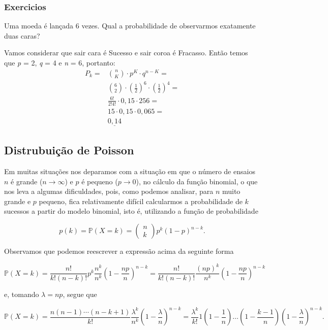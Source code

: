 \documentclass[10pt,a4paper]{article}
\begin{document}
\subsubsection{Exercicios}
\begin{ex}
	Uma moeda é lançada 6 vezes. Qual a probabilidade de observarmos exatamente duas caras?
\end{ex}
\begin{sol}
	Vamos considerar que sair cara é Sucesso e sair coroa é Fracasso. Então temos que \textit{p} = 2, \textit{q} = 4 e \textit{n} = 6, portanto:
	\[
		\begin{aligned}
		P_{k} =& \binom{n}{K} \cdot p^{K} \cdot q^{n-K} =		\\
		& \binom{6}{2} \cdot (\frac{1}{2})^{6} \cdot (\frac{1}{2})^{4} =\\
		& \frac{6!}{2!4!} \cdot 0,15 \cdot 256=\\
		& 15 \cdot 0,15 \cdot 0,065=\\
		& \underline{0,14}
		\end{aligned}
	\]
\end{sol}

\subsection{Distrubuição de Poisson}
Em muitas situações nos deparamos com a situação em que o número de ensaios $ n $ é grande ($ n\rightarrow \infty $) e $ p $ é pequeno ($ p\rightarrow 0 $), no cálculo da função binomial, o que nos leva a algumas dificuldades, pois, como podemos analisar, para $ n $ muito grande e $ p $ pequeno, fica relativamente difícil calcularmos a probabilidade de $ k $ sucessos a partir do modelo binomial, isto é, utilizando a função de probabilidade

\[p(k)=\mathbb{P}(X=k)=\left(\begin{array}{c}n\\k\end{array}\right)p^k(1-p)^{n-k}.\] 	

Observamos que podemos reescrever a expressão acima da seguinte forma

\[\mathbb{P}(X=k)=\frac{n!}{k!(n-k)!}p^k\frac{n^k}{n^k}\left(1-\frac{np}{n}\right)^{n-k}=\frac{n!}{k!(n-k)!}\frac{(np)^k}{n^k}\left(1-\frac{np}{n}\right)^{n-k}\] 	

e, tomando $ \lambda = np $, segue que

\[\mathbb{P}(X = k)=\frac{n(n-1)\cdots(n-k+1)}{k!}\frac{\lambda^k}{n^k}\left(1-\frac{\lambda}{n}\right)^{n-k}=\frac{\lambda^k}{k!}1\left(1-\frac{1}{n}\right)\dots\left(1-\frac{k-1}{n}\right)\left(1-\frac{\lambda}{n}\right)^{n-k}.\] 	
\end{document}
